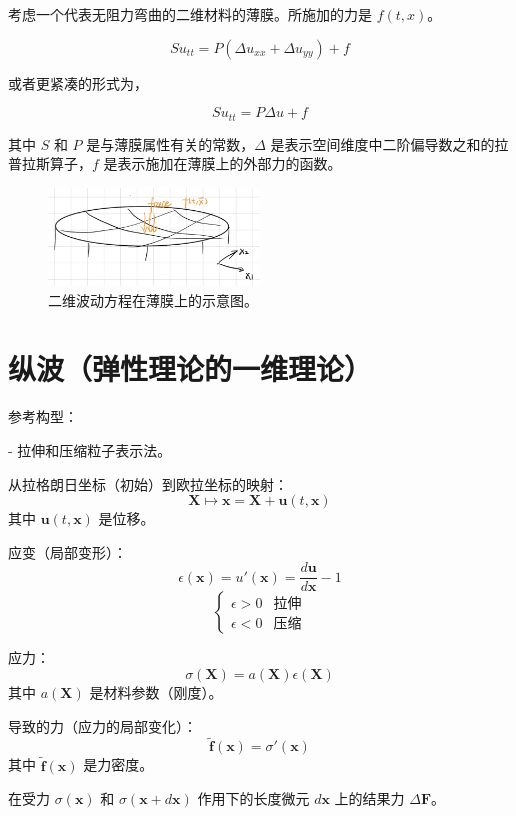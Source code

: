 \documentclass{ctexart}
\begin{document}
考虑一个代表无阻力弯曲的二维材料的薄膜。所施加的力是 \( f(t,x) \)。

\[
S u_{tt} = P (\Delta u_{xx} + \Delta u_{yy}) + f
\]

或者更紧凑的形式为，

\[
S u_{tt} = P \Delta u + f
\]

其中 \( S \) 和 \( P \) 是与薄膜属性有关的常数，\( \Delta \) 是表示空间维度中二阶偏导数之和的拉普拉斯算子，\( f \) 是表示施加在薄膜上的外部力的函数。

\begin{figure}[h!]
\centering
\includegraphics[width=0.5\textwidth]{membrane.png}
\caption{二维波动方程在薄膜上的示意图。}
\end{figure}

\newpage
\date{21.11.2023.PDE}
\section*{纵波（弹性理论的一维理论）}

参考构型：

- 拉伸和压缩粒子表示法。

从拉格朗日坐标（初始）到欧拉坐标的映射：
\[
\mathbf{X} \mapsto \mathbf{x} = \mathbf{X} + \mathbf{u}(t,\mathbf{x})
\]
其中 \( \mathbf{u}(t,\mathbf{x}) \) 是位移。

应变（局部变形）：
\[
\epsilon(\mathbf{x}) = u'(\mathbf{x}) = \frac{d\mathbf{u}}{d\mathbf{x}} - 1
\]
\[
\begin{cases} 
\epsilon > 0 & \text{拉伸} \\
\epsilon < 0 & \text{压缩}
\end{cases}
\]

应力：
\[
\sigma(\mathbf{X}) = a(\mathbf{X}) \epsilon(\mathbf{X})
\]
其中 \( a(\mathbf{X}) \) 是材料参数（刚度）。

导致的力（应力的局部变化）：
\[
\tilde{\mathbf{f}}(\mathbf{x}) = \sigma'(\mathbf{x})
\]
其中 \( \tilde{\mathbf{f}}(\mathbf{x}) \) 是力密度。

在受力 \( \sigma(\mathbf{x}) \) 和 \( \sigma(\mathbf{x} + d\mathbf{x}) \) 作用下的长度微元 \( d\mathbf{x} \) 上的结果力 \( \Delta \mathbf{F} \)。
\end{document}
